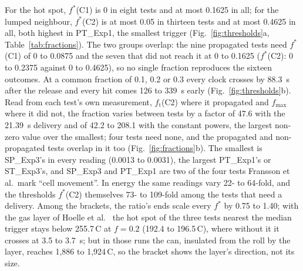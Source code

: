 \documentclass[preprint,12pt]{elsarticle}
\newcommand{\degC}{\,\textdegree C}
\newcommand{\fs}{f^{*}}
\newcommand{\ft}{f_{\mathrm{t}}}
\newcommand{\fmax}{f_{\mathrm{max}}}
\begin{document}
For the hot spot, $\fs$(C1) is 0 in eight tests and at most 0.1625 in all; for the lumped neighbour, $\fs$(C2) is at most 0.05 in thirteen tests and at most 0.4625 in all, both highest in PT\_Exp1, the smallest trigger (Fig.~\ref{fig:thresholds}a, Table~\ref{tab:fractions}). The two groups overlap: the nine propagated tests need $\fs$(C1) of 0 to 0.0875 and the seven that did not reach it at 0 to 0.1625 ($\fs$(C2): 0 to 0.2375 against 0 to 0.4625), so no single fraction reproduces the sixteen outcomes. At a common fraction of 0.1, 0.2 or 0.3 every clock crosses by 88.3~s after the release and every hit comes 126 to 339~s early (Fig.~\ref{fig:thresholds}b). Read from each test's own measurement, $\ft$(C2) where it propagated and $\fmax$ where it did not, the fraction varies between tests by a factor of 47.6 with the 21.39~s delivery and of 42.2 to 208.1 with the constant powers, the largest non-zero value over the smallest; four tests need none, and the propagated and non-propagated tests overlap in it too (Fig.~\ref{fig:fractions}b). The smallest is SP\_Exp3's in every reading (0.0013 to 0.0031), the largest PT\_Exp1's or ST\_Exp3's, and SP\_Exp3 and PT\_Exp1 are two of the four tests Fransson et al.\ mark ``cell movement''. In energy the same readings vary 22- to 64-fold, and the thresholds $\fs$(C2) themselves 73- to 109-fold among the tests that need a delivery. Among the brackets, the ratio's ends scale every $\fs$ by 0.75 to 1.40; with the gas layer of Hoelle et al.~\cite{hoelle2023simulation} the hot spot of the three tests nearest the median trigger stays below 255.7\degC{} at $f=0.2$ (192.4 to 196.5\degC), where without it it crosses at 3.5 to 3.7~s; but in those runs the can, insulated from the roll by the layer, reaches 1,886 to 1,924\degC, so the bracket shows the layer's direction, not its size.
\end{document}
